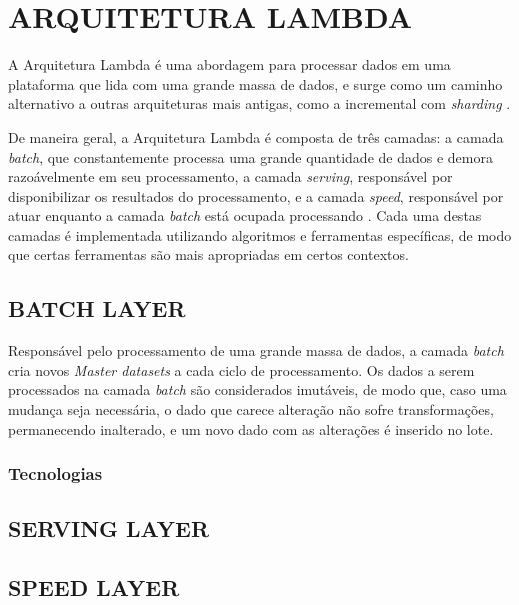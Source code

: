 \chapter[ARQUITETURA LAMBDA]{ARQUITETURA LAMBDA}

A Arquitetura Lambda é uma abordagem para processar dados em uma plataforma
que lida com uma grande massa de dados, e surge como um caminho alternativo
a outras arquiteturas mais antigas, como a incremental com \textit{sharding}
\cite{marz2015}.

De maneira geral, a Arquitetura Lambda é composta de três camadas: a camada
\textit{batch}, que constantemente processa uma grande quantidade de dados e
demora razoávelmente em seu processamento, a camada \textit{serving},
responsável por disponibilizar os resultados do processamento, e a camada
\textit{speed}, responsável por atuar enquanto a camada \textit{batch} está
ocupada processando \cite{marz2015}. Cada uma destas camadas é implementada
utilizando algoritmos e ferramentas específicas, de modo que certas ferramentas
são mais apropriadas em certos contextos.

\section{BATCH LAYER}

Responsável pelo processamento de uma grande massa de dados, a camada
\textit{batch} cria novos \textit{Master datasets} a cada ciclo de
processamento. Os dados a serem processados na camada \textit{batch} são
considerados imutáveis, de modo que, caso uma mudança seja necessária, o dado
que carece alteração não sofre transformações, permanecendo inalterado, e um
novo dado com as alterações é inserido no lote.

\subsection{Tecnologias}

\section{SERVING LAYER}

\section{SPEED LAYER}
